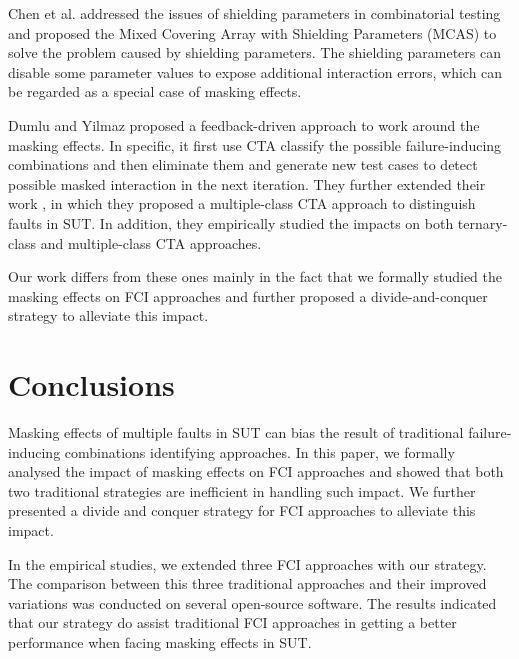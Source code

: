 \documentclass{sig-alternate}
\begin{document}
Chen et al. addressed the issues of shielding parameters in combinatorial testing and proposed the Mixed Covering Array with Shielding Parameters (MCAS) to solve the problem caused by shielding parameters\cite{chen2010combinatorial}. The shielding parameters can disable some parameter values to expose additional interaction errors, which can be regarded as a special case of masking effects.

Dumlu and Yilmaz proposed a feedback-driven approach to work around the masking effects\cite{dumlu2011feedback}. In specific, it first use CTA classify the possible failure-inducing combinations and then eliminate them and generate new test cases to detect possible masked interaction in the next iteration. They further extended their work \cite{yilmaz2013reducing}, in which they proposed a multiple-class CTA approach to distinguish faults in SUT. In addition, they empirically studied the impacts on both ternary-class and multiple-class CTA approaches.

Our work differs from these ones mainly in the fact that we formally studied the masking effects on FCI approaches and further proposed a divide-and-conquer strategy to alleviate this impact.

\section{Conclusions}
Masking effects of multiple faults in SUT can bias the result of traditional failure-inducing combinations identifying approaches. In this paper, we formally analysed the impact of masking effects on FCI approaches and showed that both two traditional strategies are inefficient in handling such impact. We further presented a divide and conquer strategy for FCI approaches to alleviate this impact.


In the empirical studies, we extended three FCI approaches with our strategy. The comparison between this three traditional approaches and their improved variations was conducted on several open-source software. The results indicated that our strategy do assist traditional FCI approaches in getting a better performance when facing masking effects in SUT.
\end{document}
